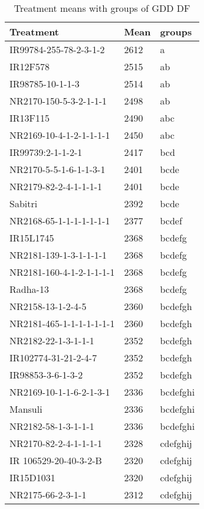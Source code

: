 \documentclass[]{article}
\begin{document}
\begin{longtable}{lll}
\caption{\label{tab:two-fac-groups-tab-agroclimate-normal}Treatment means with groups of GDD DF}\\
\toprule
Treatment & Mean & groups\\
\midrule
\rowcolor{gray!6}  IR99784-255-78-2-3-1-2 & 2612 & a\\
IR12F578 & 2515 & ab\\
\rowcolor{gray!6}  IR98785-10-1-1-3 & 2514 & ab\\
NR2170-150-5-3-2-1-1-1 & 2498 & ab\\
\rowcolor{gray!6}  IR13F115 & 2490 & abc\\
\addlinespace
NR2169-10-4-1-2-1-1-1-1 & 2450 & abc\\
\rowcolor{gray!6}  IR99739:2-1-1-2-1 & 2417 & bcd\\
NR2170-5-5-1-6-1-1-3-1 & 2401 & bcde\\
\rowcolor{gray!6}  NR2179-82-2-4-1-1-1-1 & 2401 & bcde\\
Sabitri & 2392 & bcde\\
\addlinespace
\rowcolor{gray!6}  NR2168-65-1-1-1-1-1-1-1 & 2377 & bcdef\\
IR15L1745 & 2368 & bcdefg\\
\rowcolor{gray!6}  NR2181-139-1-3-1-1-1-1 & 2368 & bcdefg\\
NR2181-160-4-1-2-1-1-1-1 & 2368 & bcdefg\\
\rowcolor{gray!6}  Radha-13 & 2368 & bcdefg\\
\addlinespace
NR2158-13-1-2-4-5 & 2360 & bcdefgh\\
\rowcolor{gray!6}  NR2181-465-1-1-1-1-1-1-1 & 2360 & bcdefgh\\
NR2182-22-1-3-1-1-1 & 2352 & bcdefgh\\
\rowcolor{gray!6}  IR102774-31-21-2-4-7 & 2352 & bcdefgh\\
IR98853-3-6-1-3-2 & 2352 & bcdefgh\\
\addlinespace
\rowcolor{gray!6}  NR2169-10-1-1-6-2-1-3-1 & 2336 & bcdefghi\\
Mansuli & 2336 & bcdefghi\\
\rowcolor{gray!6}  NR2182-58-1-3-1-1-1 & 2336 & bcdefghi\\
NR2170-82-2-4-1-1-1-1 & 2328 & cdefghij\\
\rowcolor{gray!6}  IR 106529-20-40-3-2-B & 2320 & cdefghij\\
\addlinespace
IR15D1031 & 2320 & cdefghij\\
\rowcolor{gray!6}  NR2175-66-2-3-1-1 & 2312 & cdefghij\\

\end{longtable}
\end{document}
